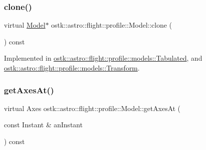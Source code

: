 \mbox{\label{classostk_1_1astro_1_1flight_1_1profile_1_1_model_aabf68c114849fa16a570b694579da40f}} 
\subsubsection{\texorpdfstring{clone()}{clone()}}
{\footnotesize\ttfamily virtual \hyperlink{classostk_1_1astro_1_1flight_1_1profile_1_1_model}{Model}$\ast$ ostk\+::astro\+::flight\+::profile\+::\+Model\+::clone (\begin{DoxyParamCaption}{ }\end{DoxyParamCaption}) const\hspace{0.3cm}{\ttfamily [pure virtual]}}



Implemented in \hyperlink{classostk_1_1astro_1_1flight_1_1profile_1_1models_1_1_tabulated_a1c9f4f5711ac2ae0cc545d89b0ee4d53}{ostk\+::astro\+::flight\+::profile\+::models\+::\+Tabulated}, and \hyperlink{classostk_1_1astro_1_1flight_1_1profile_1_1models_1_1_transform_aafd4791dacf320ddedddefbc8d0f2e0e}{ostk\+::astro\+::flight\+::profile\+::models\+::\+Transform}.

\mbox{\label{classostk_1_1astro_1_1flight_1_1profile_1_1_model_ab18bd79e421c36df4ab716649ce549cd}} 
\subsubsection{\texorpdfstring{get\+Axes\+At()}{getAxesAt()}}
{\footnotesize\ttfamily virtual Axes ostk\+::astro\+::flight\+::profile\+::\+Model\+::get\+Axes\+At (\begin{DoxyParamCaption}\item[{const Instant \&}]{an\+Instant }\end{DoxyParamCaption}) const\hspace{0.3cm}{\ttfamily [pure virtual]}}



